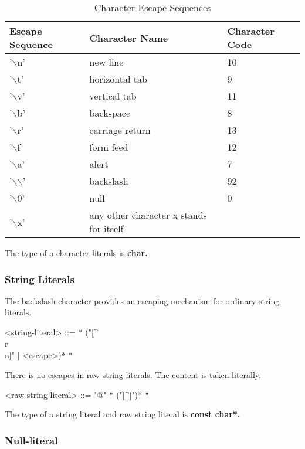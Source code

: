\documentclass[a4paper,oneside,11pt]{article}
\begin{document}
\begin{table}[htb]
\caption{Character Escape Sequences}\label{tab:charescape}
\begin{tabular}{lll}
\textbf{Escape Sequence }& \textbf{Character Name} & \textbf{Character Code}\\
\hline
'$\backslash$n' & new line& 10\\
'$\backslash$t' & horizontal tab& 9\\
'$\backslash$v' & vertical tab& 11\\
'$\backslash$b' & backspace & 8\\
'$\backslash$r' & carriage return & 13\\
'$\backslash$f' & form feed & 12\\
'$\backslash$a' & alert & 7\\
'$\backslash$$\backslash$' & backslash & 92\\
'$\backslash$0' & null & 0\\
'$\backslash$x' & any other character x stands for itself
\end{tabular}
\end{table}
The type of a character literals is \bf{char}.

\subsubsection{String Literals}

The backslash character provides an escaping mechanism for ordinary string literals.

\begin{grammar}
\label{string-literal}<string-literal> ::= \verb|"| ("[^\"\\r\\n]" | <escape>)* \verb|"|
\end{grammar}

There is no escapes in raw string literals. The content is taken literally.

\begin{grammar}
\label{raw-string-literal}<raw-string-literal> ::= "@" \verb|"| ("[^\"]")* \verb|"|
\end{grammar}

The type of a string literal and raw string literal is \bf{const char*}.

\subsubsection{Null-literal}
\end{document}
